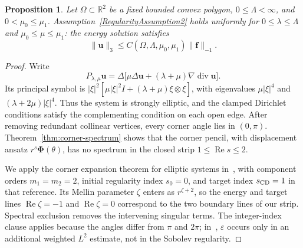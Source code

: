 \documentclass[10pt]{amsart}
\newtheorem{proposition}[theorem]{Proposition}
\renewcommand{\div}{\operatorname{div}}
\numberwithin{equation}{section}
\begin{document}
\begin{proposition}\label{prop:convex-lame}
Let $\Omega\subset\mathbb R^2$ be a fixed bounded convex polygon, $0\leq\Lambda<\infty$, and $0<\mu_0\leq\mu_1$. Assumption~\ref{RegularityAssumption2} holds uniformly for $0\leq\lambda\leq\Lambda$ and $\mu_0\leq\mu\leq\mu_1$: the energy solution satisfies
\[
\|\boldsymbol u\|_3\leq C(\Omega,\Lambda,\mu_0,\mu_1)\|\boldsymbol f\|_{-1}.
\]
\end{proposition}
\begin{proof}
Write
\[
P_{\lambda,\mu}\boldsymbol u
=\Delta\big[\mu\Delta\boldsymbol u+(\lambda+\mu)\nabla\div\boldsymbol u\big].
\]
Its principal symbol is
$|\xi|^2[\mu|\xi|^2I+(\lambda+\mu)\xi\otimes\xi]$,
with eigenvalues $\mu|\xi|^4$ and $(\lambda+2\mu)|\xi|^4$. Thus the system is strongly elliptic, and the clamped Dirichlet conditions satisfy the complementing condition on each open edge. After removing redundant collinear vertices, every corner angle lies in $(0,\pi)$. Theorem~\ref{thm:corner-spectrum} shows that the corner pencil, with displacement ansatz $r^s\boldsymbol\Phi(\theta)$, has no spectrum in the closed strip $1\leq\operatorname{Re}s\leq2$.

We apply the corner expansion theorem for elliptic systems in~\cite[Theorem~1.1(ii), pp.~1684--1685, and Sections~1.c and~2.a]{CostabelDauge1994}, with component orders $m_1=m_2=2$, initial regularity index $s_0=0$, and target index $s_{\rm CD}=1$ in that reference. Its Mellin parameter $\zeta$ enters as $r^{\zeta+2}$, so the energy and target lines $\operatorname{Re}\zeta=-1$ and $\operatorname{Re}\zeta=0$ correspond to the two boundary lines of our strip. Spectral exclusion removes the intervening singular terms. The integer-index clause applies because the angles differ from $\pi$ and $2\pi$; in~\cite[equation~(1.6), p.~1685]{CostabelDauge1994}, $\varepsilon$ occurs only in an additional weighted $L^2$ estimate, not in the Sobolev regularity.


\end{proof}
\end{document}
